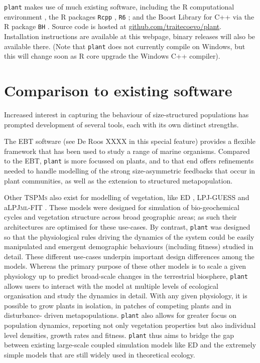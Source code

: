 \documentclass[a4paper,11pt]{article}
\newcommand{\plant}{\texttt{plant}}
\begin{document}
{\plant} makes use of much existing software, including the R
computational environment \citep{R-2015}, the R packages \texttt{Rcpp}
\citep{Eddelbuettel-2011, Eddelbuettel-2013}, \texttt{R6}
\citep{Chang-2014}; and the Boost Library for C++
\citep{Schaling-2014} via the R package \texttt{BH}
\citep{Eddelbuettel-2015}. Source code is hosted at
\href{https://github.com/traitecoevo/plant}{github.com/traitecoevo/plant}.
Installation instructions are available at this webpage, binary
releases will also be available there.  (Note that {\plant} does not
currently compile on Windows, but this will change soon as R core
upgrade the Windows C++ compiler).

\section{Comparison to existing software}

Increased interest in capturing the behaviour of size-structured  populations
has prompted development of several tools, each with its own distinct
strengths. 

The \textsc{EBT} software (see De Roos XXXX in this special feature) provides 
a flexible framework that has been used to study a range of marine organisms.
Compared to the \textsc{EBT}, {\plant} is more focussed on plants, and 
to that end offers refinements needed to handle modelling of the strong 
size-asymmetric feedbacks that occur in plant communities, as well as the 
extension to structured metapopulation.

Other \textsc{TSPMs} also exist for modelling of vegetation, like \textsc{ED}
\citep[ver 1 and 2][]{Moorcroft-2001, Medvigy-2009}, \textsc {LPJ-GUESS}
\citep{Smith-2014} and a\textsc{LPJml-FIT}  \citep{Sakschewski-2015}. These
models were designed for simulation of bio-geochemical cycles and vegetation
structure across broad geographic areas; as such their architectures are
optimised for these use-cases. By contrast, {\plant} was  designed so that the
physiological rules driving the dynamics of the system could be easily
manipulated and emergent demographic behaviours (including fitness) studied in
detail. These different use-cases underpin important design differences among
the models. Whereas the primary purpose of these other models is to scale a
given physiology up to predict  broad-scale changes in the terrestrial
biosphere, {\plant} allows users to  interact with the model at multiple
levels of ecological organisation and  study the dynamics in detail. With any
given physiology, it is possible to  grow plants in isolation, in patches of
competing plants and in disturbance- driven metapopulations. {\plant} also
allows for greater focus on population dynamics, reporting not only vegetation
properties but also individual level densities, growth rates and fitness.
{\plant} thus aims to bridge the gap between existing large-scale coupled
simulation models like \textsc{ED} and the extremely simple models that are
still widely  used in theoretical ecology. 
\end{document}
